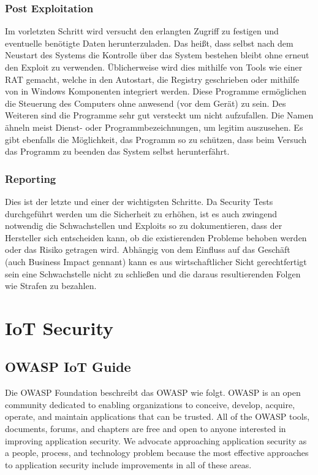     \subsubsection{\glqq Post Exploitation\grqq{}}
        Im vorletzten Schritt wird versucht den erlangten Zugriff zu festigen und eventuelle benötigte Daten herunterzuladen. Das heißt, dass selbst nach dem Neustart des Systems die Kontrolle über das System bestehen bleibt ohne erneut den Exploit zu verwenden. Üblicherweise wird dies mithilfe von Tools wie einer \ac{RAT} gemacht, welche in den Autostart, die Registry geschrieben oder mithilfe von in Windows Komponenten integriert werden.
        Diese Programme ermöglichen die Steuerung des Computers ohne anwesend (vor dem Gerät) zu sein. Des Weiteren sind die Programme sehr gut versteckt um nicht aufzufallen. Die Namen ähneln meist Dienst- oder Programmbezeichnungen, um legitim auszusehen. Es gibt ebenfalls die Möglichkeit, das Programm so zu schützen, dass beim Versuch das Programm zu beenden das System selbst herunterfährt.
    \subsubsection{\glqq Reporting\grqq{}}
        Dies ist der letzte und einer der wichtigsten Schritte. Da Security Tests durchgeführt werden um die Sicherheit zu erhöhen, ist es auch zwingend notwendig die Schwachstellen und Exploits so zu dokumentieren, dass der Hersteller sich entscheiden kann, ob die existierenden Probleme behoben werden oder das Risiko getragen wird. Abhängig von dem Einfluss auf das Geschäft (auch Business Impact gennant) kann es aus wirtschaftlicher Sicht gerechtfertigt sein eine Schwachstelle nicht zu schließen und die daraus resultierenden Folgen wie Strafen zu bezahlen.

\section{IoT Security}
    \subsection{OWASP IoT Guide}
        Die OWASP Foundation \cite{guzman_2019} beschreibt das \ac{OWASP} wie folgt.
        \glqq OWASP is an open community dedicated to enabling organizations to conceive, develop, acquire, operate, and maintain applications that can be trusted. All of the OWASP tools, documents, forums, and chapters are free and open to anyone interested in improving application security. We advocate approaching application security as a people, process, and technology problem because the most effective approaches to application security include improvements in all of these areas.\grqq{}
        
